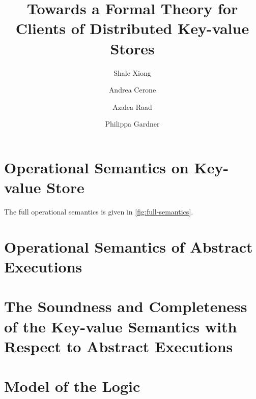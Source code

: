 \documentclass[runningheads]{llncs}
\newif\ifTechReport
\newcommand{\RootPath}{.}
\begin{document}
\title{
	Towards a Formal Theory for Clients of Distributed Key-value Stores
    } 


\author{%
Shale Xiong \and
Andrea Cerone \and
Azalea Raad \and
Philippa Gardner }
%
%


\maketitle

\begin{abstract}
    
\end{abstract}





\ifTechReport




\fi

%




\newpage
\appendix
\ifTechReport
\else
\section{Operational Semantics on Key-value Store}
\label{sec:full-semantics}
The full operational semantics is given in \cref{fig:full-semantics}.


\section{Operational Semantics of Abstract Executions}

\section{The Soundness and Completeness of the Key-value Semantics with Respect to Abstract Executions}
\label{sec:kv-sound-complete-proof}



\section{Model of the Logic}
\label{sec:model-of-logic}





\fi
\end{document}

